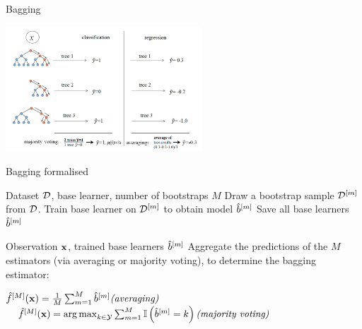 \documentclass[11pt,compress,t,notes=noshow, xcolor=table]{beamer}
\begin{document}
\begin{vbframe}{Bagging}
\begin{center}
\includegraphics[width=0.55\textwidth]{figure_man/rf_majvot_averaging.png}
\end{center}
\end{vbframe}


\begin{vbframe}{Bagging formalised}

\begin{algorithm}[H]
  \footnotesize
  \caption*{Bagging algorithm: Training}
  \begin{algorithmic}[1]
     Dataset $\mathcal{D}$, base learner, number of bootstraps $M$
      \State Draw a bootstrap sample $\mathcal{D}^{[m]}$ from $\mathcal{D}$.
      \State Train base learner on $\mathcal{D}^{[m]}$ to obtain model $\hat{b}^{[m]}$
    \EndFor
    \State Save all base learners $\hat{b}^{[m]}$
  \end{algorithmic}
\end{algorithm}

\begin{algorithm}[H]
  \footnotesize
  \caption*{Bagging algorithm: Prediction}
  \begin{algorithmic}[1]
     Observation $\mathbf{x}$, trained base learners $\hat{b}^{[m]}$
    \State Aggregate the predictions of the $M$ estimators (via averaging or majority voting), to determine the bagging estimator:
    \begin{center}
    $\hat f^{[M]}(\mathbf{x}) = \frac{1}{M} \sum_{m=1}^M \hat{b}^{[m]} \textit{(averaging)}$
    $\quad \hat f^{[M]}(\mathbf{x}) = \operatorname*{arg\,max}_{k \in \mathcal{Y}} \sum_{m=1}^M \mathbb{I}\left(\hat{b}^{[m]} = k\right) \textit{(majority voting)}$
    \end{center}
  \end{algorithmic}
\end{algorithm}

\end{vbframe}
\end{document}
